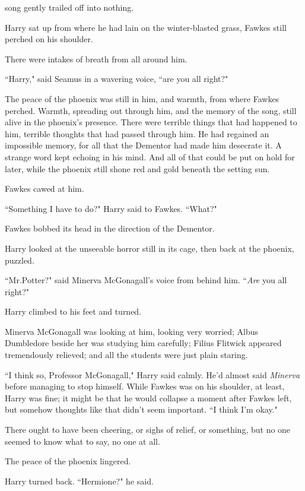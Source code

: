 
 song gently trailed off into nothing.

\hplettrineextrapara
Harry sat up from where he had lain on the winter-blasted grass, Fawkes still perched on his shoulder.

There were intakes of breath from all around him.

``Harry," said Seamus in a wavering voice, ``are you all right?"

The peace of the phoenix was still in him, and warmth, from where Fawkes perched. Warmth, spreading out through him, and the memory of the song, still alive in the phoenix's presence. There were terrible things that had happened to him, terrible thoughts that had passed through him. He had regained an impossible memory, for all that the Dementor had made him desecrate it. A strange word kept echoing in his mind. And all of that could be put on hold for later, while the phoenix still shone red and gold beneath the setting sun.

Fawkes cawed at him.

``Something I have to do?" Harry said to Fawkes. ``What?"

Fawkes bobbed its head in the direction of the Dementor.

Harry looked at the unseeable horror still in its cage, then back at the phoenix, puzzled.

``Mr.\?Potter?" said Minerva McGonagall's voice from behind him. ``\emph{Are} you all right?"

Harry climbed to his feet and turned.

Minerva McGonagall was looking at him, looking very worried; Albus Dumbledore beside her was studying him carefully; Filius Flitwick appeared tremendously relieved; and all the students were just plain staring.

``I think so, Professor McGonagall," Harry said calmly. He'd almost said \emph{Minerva} before managing to stop himself. While Fawkes was on his shoulder, at least, Harry was fine; it might be that he would collapse a moment after Fawkes left, but somehow thoughts like that didn't seem important. ``I think I'm okay."

There ought to have been cheering, or sighs of relief, or something, but no one seemed to know what to say, no one at all.

The peace of the phoenix lingered.

Harry turned back. ``Hermione?" he said.

